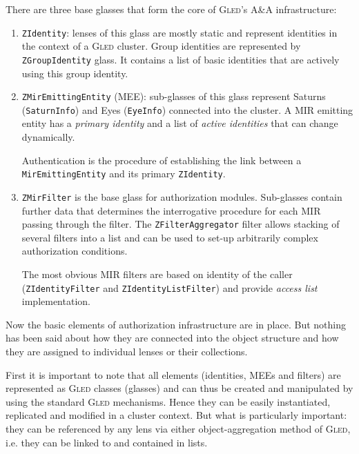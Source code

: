 \documentclass[a4paper,11pt]{article}
\def\gled{\textsc{Gled}\xspace}
\def\smalltt#1{{\small\texttt{#1}}}
\begin{document}
There are three base glasses that form the core of \gled's A\&A
infrastructure:
\begin{enumerate}

\item \texttt{ZIdentity}: lenses of this glass are mostly static and
  represent identities in the context of a \gled cluster. Group
  identities are represented by \smalltt{ZGroupIdentity} glass. It
  contains a list of basic identities that are actively using this
  group identity.
  
\item \texttt{ZMirEmittingEntity} (MEE): sub-glasses of this glass represent
  Saturns (\smalltt{SaturnInfo}) and Eyes (\smalltt{EyeInfo}) connected
  into the cluster. A MIR emitting entity has a \emph{primary
    identity} and a list of \emph{active identities} that can change
  dynamically.

  Authentication is the procedure of establishing the link between a
  \texttt{MirEmittingEntity} and its primary \smalltt{ZIdentity}.
  
\item \texttt{ZMirFilter} is the base glass for authorization modules.
  Sub-glasses contain further data that determines the interrogative
  procedure for each MIR passing through the filter. The
  \smalltt{ZFilterAggregator} filter allows stacking of several filters
  into a list and can be used to set-up arbitrarily complex
  authorization conditions.
  
  The most obvious MIR filters are based on identity of the caller
  (\texttt{ZIdentityFilter} and \smalltt{ZIdentityListFilter}) and
  provide \emph{access list} implementation.

\end{enumerate}

Now the basic elements of authorization infrastructure are in place.
But nothing has been said about how they are connected into the object
structure and how they are assigned to individual lenses or their
collections.

First it is important to note that all elements (identities, MEEs and
filters) are represented as \gled classes (glasses) and can thus be
created and manipulated by using the standard \gled mechanisms. Hence
they can be easily instantiated, replicated and modified in a cluster
context. But what is particularly important: they can be referenced by
any lens via either object-aggregation method of \gled, i.e. they can
be linked to and contained in lists.
\end{document}
